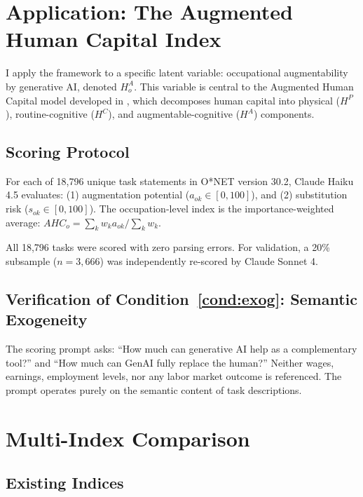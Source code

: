 \documentclass[11pt,a4paper]{article}
\theoremstyle{definition}
\begin{document}
\section{Application: The Augmented Human Capital Index}
\label{sec:application}

I apply the framework to a specific latent variable: occupational augmentability by generative AI, denoted $H^A_o$. This variable is central to the Augmented Human Capital model developed in \citet{espinal2026ahc}, which decomposes human capital into physical ($H^P$), routine-cognitive ($H^C$), and augmentable-cognitive ($H^A$) components.

\subsection{Scoring Protocol}

For each of 18,796 unique task statements in O*NET version 30.2, Claude Haiku 4.5 evaluates: (1) augmentation potential ($a_{ok} \in [0, 100]$), and (2) substitution risk ($s_{ok} \in [0, 100]$). The occupation-level index is the importance-weighted average: $AHC_o = \sum_k w_k a_{ok} / \sum_k w_k$.

All 18,796 tasks were scored with zero parsing errors. For validation, a 20\% subsample ($n = 3{,}666$) was independently re-scored by Claude Sonnet 4.

\subsection{Verification of Condition~\ref{cond:exog}: Semantic Exogeneity}

The scoring prompt asks: ``How much can generative AI help as a complementary tool?'' and ``How much can GenAI fully replace the human?'' Neither wages, earnings, employment levels, nor any labor market outcome is referenced. The prompt operates purely on the semantic content of task descriptions.


\section{Multi-Index Comparison}
\label{sec:multiindex}

\subsection{Existing Indices}
\end{document}
